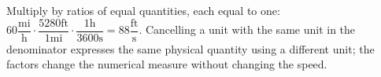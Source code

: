 Multiply by ratios of equal quantities, each equal to one: $60\dfrac{\mathrm{mi}}{\mathrm{h}}\cdot\dfrac{5280\mathrm{ft}}{1\mathrm{mi}}\cdot\dfrac{1\mathrm{h}}{3600\mathrm{s}}=\boxed{88\dfrac{\mathrm{ft}}{\mathrm{s}}}$. Cancelling a unit with the same unit in the denominator expresses the same physical quantity using a different unit; the factors change the numerical measure without changing the speed.
